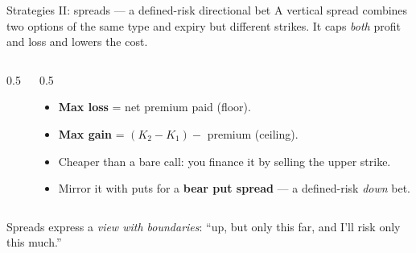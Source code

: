 \documentclass[11pt,aspectratio=169]{beamer}
\newcommand{\keybox}[1]{%
  \begin{beamercolorbox}[wd=\textwidth,sep=0.6em,rounded=true]{}%
    \colorbox{soft}{\parbox{\dimexpr\textwidth-1.4em}{\color{ink}#1}}%
  \end{beamercolorbox}}
\begin{document}
\begin{frame}{Strategies II: spreads — a defined-risk directional bet}
  A \alert{vertical spread} combines two options of the same type and
  expiry but different strikes. It caps \emph{both} profit and loss and
  lowers the cost.
  \vspace{0.3em}
  \begin{columns}[c]
    \begin{column}{0.5\textwidth}
      \\[-0.1em]
    \end{column}
    \begin{column}{0.5\textwidth}
      \begin{itemize}\small
        \item \textbf{Max loss} = net premium paid (floor).
        \item \textbf{Max gain} = $(K_2-K_1)-$ premium (ceiling).
        \item Cheaper than a bare call: you finance it by selling the upper strike.
        \item Mirror it with puts for a \textbf{bear put spread} — a defined-risk \emph{down} bet.
      \end{itemize}
    \end{column}
  \end{columns}
  \vspace{0.2em}
  \keybox{Spreads express a \emph{view with boundaries}: ``up, but only this far, and I'll risk only this much.''}
\end{frame}
\end{document}
